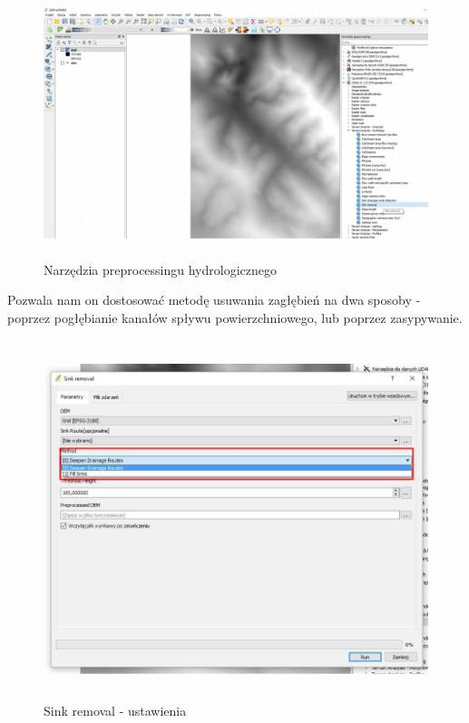 \documentclass[12pt,a4paper]{book}
\begin{document}
\begin{center}
\begin{figure}
\includegraphics[width=13cm,height=7.807cm]{004-pre-hydro.jpg}
\caption{Narzędzia preprocessingu hydrologicznego}
\end{figure}
\end{center}
Pozwala nam on dostosować metodę usuwania zagłębień na dwa sposoby - poprzez pogłębianie kanałów spływu powierzchniowego, lub poprzez {\textquotedbl}zasypywanie{\textquotedbl}.



\begin{center}
\begin{figure}
\includegraphics[width=13cm,height=10.456cm]{004-sink.jpg}
\caption{Sink removal - ustawienia}
\end{figure}
\end{center}
\end{document}
